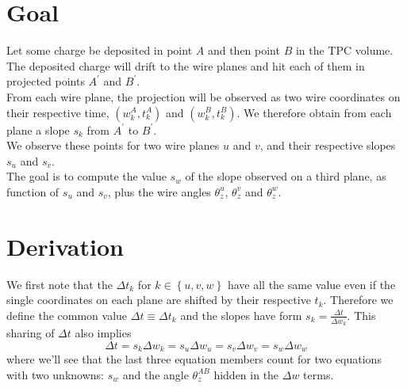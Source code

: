 \documentclass{article}
\newcommand{\MathSym}[1]{\ensuremath{#1}\xspace}
\providecommand{\defined}{\ensuremath{\equiv}}
\DeclareRobustCommand{\brackets}[1]{\ensuremath{\left(#1\right)}}
\newcommand{\braces}[1]{\ensuremath{\left\{{#1}\right\}}}
\newcommand{\thetaDeltaP}{\MathSym{\theta_{z}^{AB}}}
\begin{document}
	
	\section{Goal}
	\label{sec:Goal}
	
	Let some charge be deposited in point $A$ and then point $B$ in the TPC volume.\\
	The deposited charge will drift to the wire planes and hit each of them in projected points $A^{\prime}$ and $B^{\prime}$.\\
	From each wire plane, the projection will be observed as two wire coordinates on their respective time, $\brackets{w^{A}_{k}, t^{A}_{k}}$ and $\brackets{w^{B}_{k}, t^{B}_{k}}$.
	We therefore obtain from each plane a slope $s_{k}$ from $A^{\prime}$ to $B^{\prime}$.\\
	We observe these points for two wire planes $u$ and $v$, and their respective slopes $s_{u}$ and $s_{v}$.\\
	The goal is to compute the value $s_{w}$ of the slope observed on a third plane, as function of $s_{u}$ and $s_{v}$, plus the wire angles $\theta^{u}_{z}$, $\theta^{v}_{z}$ and $\theta^{w}_{z}$.
	
	
	\section{Derivation}
	\label{sec:Derivation}
	
	We first note that the $\Delta t_{k}$ for $k \in \braces{ u, v, w}$ have all the same value even if the single coordinates on each plane are shifted by their respective $t_{k}$.
	Therefore we define the common value $\Delta t \defined \Delta t_{k}$ and the slopes have form $s_{k} = \frac{\Delta t}{\Delta w_{k}}$.
	This sharing of $\Delta t$ also implies
	\begin{equation}
		\label{eq:DeltaT}
		\Delta t = s_{k} \Delta w_{k} = s_{u} \Delta w_{u} = s_{v} \Delta w_{v} = s_{w} \Delta w_{w}
	\end{equation}
	where we'll see that the last three equation members count for two equations with two unknowns: $s_{w}$ and the angle $\thetaDeltaP$ hidden in the $\Delta w$ terms.
	
\end{document}
